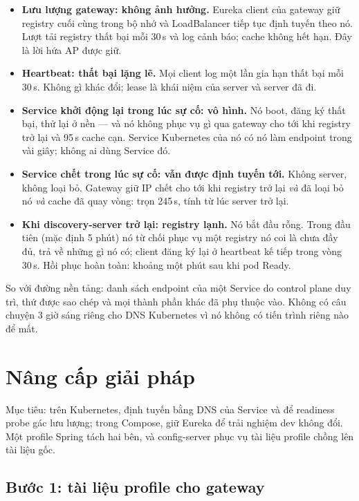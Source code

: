 \begin{itemize}
  \item \textbf{Lưu lượng gateway: không ảnh hưởng.} Eureka client của
  gateway giữ registry cuối cùng trong bộ nhớ và LoadBalancer tiếp tục
  định tuyến theo nó. Lượt tải registry thất bại mỗi 30\,s và log cảnh
  báo; cache không hết hạn. Đây là lời hứa AP được giữ.
  \item \textbf{Heartbeat: thất bại lặng lẽ.} Mọi client log một lần gia
  hạn thất bại mỗi 30\,s. Không gì khác đổi; lease là khái niệm của
  server và server đã đi.
  \item \textbf{Service khởi động lại trong lúc sự cố: vô hình.} Nó
  boot, đăng ký thất bại, thử lại ở nền --- và nó không phục vụ gì qua
  gateway cho tới khi registry trở lại và 95\,s cache cạn. Service
  Kubernetes của nó có nó làm endpoint trong vài giây; không ai dùng
  Service đó.
  \item \textbf{Service chết trong lúc sự cố: vẫn được định tuyến tới.}
  Không server, không loại bỏ. Gateway giữ IP chết cho tới khi registry
  trở lại \emph{và} đã loại bỏ nó \emph{và} cache đã quay vòng: trọn
  245\,s, tính từ lúc server trở lại.
  \item \textbf{Khi discovery-server trở lại: registry lạnh.} Nó bắt đầu
  rỗng. Trong  đầu tiên (mặc định
  5 phút) nó từ chối phục vụ một registry nó coi là chưa đầy đủ, trả về
  những gì nó có; client đăng ký lại ở heartbeat kế tiếp trong vòng
  30\,s. Hồi phục hoàn toàn: khoảng một phút sau khi pod Ready.
\end{itemize}

So với đường nền tảng: danh sách endpoint của một Service do control
plane duy trì, thứ được sao chép và mọi thành phần khác đã phụ thuộc
vào. Không có câu chuyện 3 giờ sáng riêng cho DNS Kubernetes vì nó
không có tiến trình riêng nào để mất.

\section{Nâng cấp giải pháp}
\label{sec:discovery-enhance}

Mục tiêu: trên Kubernetes, định tuyến bằng DNS của Service và để
readiness probe gác lưu lượng; trong Compose, giữ Eureka để trải nghiệm
dev không đổi. Một profile Spring tách hai bên, và config-server phục
vụ tài liệu profile chồng lên tài liệu gốc.

\subsection{Bước 1: tài liệu profile cho gateway}

